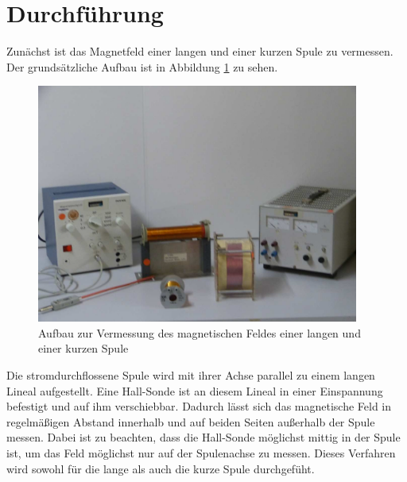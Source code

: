 \section{Durchführung}
\label{sec:Durchführung}
Zunächst ist das Magnetfeld einer langen und einer kurzen Spule zu vermessen.
Der grundsätzliche Aufbau ist in Abbildung \ref{fig:Aufbau_langekurzespule} zu sehen.
\begin{figure}
  \centering
  \includegraphics[width=300pt]{data/aufbau1.png}
  \caption{Aufbau zur Vermessung des magnetischen Feldes einer
  langen und einer kurzen Spule \cite{Versuchsanleitung}}
  \label{fig:Aufbau_langekurzespule}
\end{figure}
Die stromdurchflossene Spule wird mit ihrer Achse parallel zu einem langen Lineal
aufgestellt. Eine Hall-Sonde ist an diesem Lineal in einer Einspannung befestigt und
auf ihm verschiebbar. Dadurch lässt sich das magnetische Feld in regelmäßigen Abstand
innerhalb und auf beiden Seiten außerhalb der Spule messen. Dabei ist zu beachten, dass
die Hall-Sonde möglichst mittig in der Spule ist, um das Feld möglichst nur auf
der Spulenachse zu messen. Dieses Verfahren wird sowohl für die lange als auch die kurze
Spule durchgefüht.

